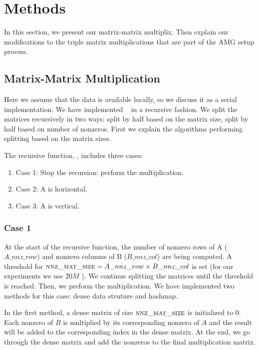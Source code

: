 \section{Methods}
\label{sec:methods}

In this section, we present our matrix-matrix multiplix. Then explain our modifications to the triple matrix multiplications that are part of the AMG setup process.

\subsection{Matrix-Matrix Multiplication}
\label{sec:matmult}

Here we assume that the data is available locally, so we discuss it as a serial implementation. We have implemented \mm~ in a recursive fashion. We split the matrices recursively in two ways: split by half based on the matrix size, split by half based on number of nonzeros. First we explain the algorithms performing splitting based on the matrix sizes.

The recursive function, \recmm, includes three cases:
\begin{enumerate}
 \item Case 1: Stop the recursion: perform the multiplication.
 \item Case 2: A is horizontal.
 \item Case 3: A is vertical.
\end{enumerate}

\subsubsection{Case 1}
\label{sec:case1}
At the start of the recursive function, the number of nonzero rows of A ($A\_nnz\_row$) and nonzero columns of B ($B\_nnz\_col$) are being computed. A threshold for $\textsc{nnz\_mat\_size} = A\_nnz\_row \times B\_nnz\_col$ is set (for our experiments we use $20M$ ).
We continue splitting the matrices until the threshold is reached. Then, we preform the multiplication. We have implemented two methods for this case: dense data struture and hashmap.

In the first method, a dense matrix of size $\textsc{nnz\_mat\_size}$ is initialized to $0$. Each nonzero of $B$ is multiplied by its corresponding nonzero of $A$ and the result will be added to the corresponding index in the dense matrix. At the end, we go through the dense matrix and add the nonzeros to the final multiplication matrix.

